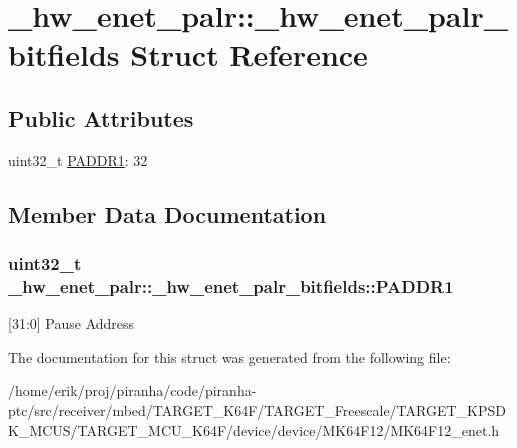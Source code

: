 \hypertarget{struct__hw__enet__palr_1_1__hw__enet__palr__bitfields}{}\section{\+\_\+hw\+\_\+enet\+\_\+palr\+:\+:\+\_\+hw\+\_\+enet\+\_\+palr\+\_\+bitfields Struct Reference}
\label{struct__hw__enet__palr_1_1__hw__enet__palr__bitfields}
\subsection*{Public Attributes}
\begin{DoxyCompactItemize}
\item 
uint32\+\_\+t \hyperlink{struct__hw__enet__palr_1_1__hw__enet__palr__bitfields_a3301b047fcae582b125a54e7f0e1fe2b}{P\+A\+D\+D\+R1}\+: 32
\end{DoxyCompactItemize}


\subsection{Member Data Documentation}
\subsubsection[{\texorpdfstring{P\+A\+D\+D\+R1}{PADDR1}}]{\setlength{\rightskip}{0pt plus 5cm}uint32\+\_\+t \+\_\+hw\+\_\+enet\+\_\+palr\+::\+\_\+hw\+\_\+enet\+\_\+palr\+\_\+bitfields\+::\+P\+A\+D\+D\+R1}\hypertarget{struct__hw__enet__palr_1_1__hw__enet__palr__bitfields_a3301b047fcae582b125a54e7f0e1fe2b}{}\label{struct__hw__enet__palr_1_1__hw__enet__palr__bitfields_a3301b047fcae582b125a54e7f0e1fe2b}
\mbox{[}31\+:0\mbox{]} Pause Address 

The documentation for this struct was generated from the following file\+:\begin{DoxyCompactItemize}
\item 
/home/erik/proj/piranha/code/piranha-\/ptc/src/receiver/mbed/\+T\+A\+R\+G\+E\+T\+\_\+\+K64\+F/\+T\+A\+R\+G\+E\+T\+\_\+\+Freescale/\+T\+A\+R\+G\+E\+T\+\_\+\+K\+P\+S\+D\+K\+\_\+\+M\+C\+U\+S/\+T\+A\+R\+G\+E\+T\+\_\+\+M\+C\+U\+\_\+\+K64\+F/device/device/\+M\+K64\+F12/M\+K64\+F12\+\_\+enet.\+h\end{DoxyCompactItemize}
